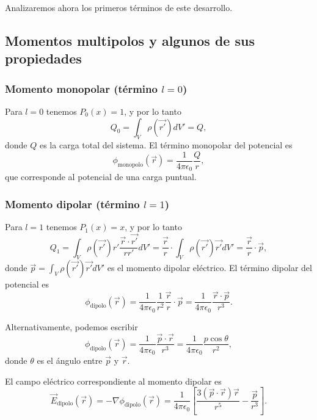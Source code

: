 \documentclass[12pt,a4paper]{book}
\begin{document}
Analizaremos ahora los primeros términos de este desarrollo.

\subsection{Momentos multipolos y algunos de sus propiedades}

\subsubsection{Momento monopolar (término $l=0$)}

Para $l=0$ tenemos $P_0(x) = 1$, y por lo tanto
\begin{equation}
Q_0 = \int_V \rho(\vec{r'}) dV' = Q,
\end{equation}
donde $Q$ es la carga total del sistema. El término monopolar del potencial es
\begin{equation}
\phi_{\text{monopolo}}(\vec{r}) = \frac{1}{4\pi\epsilon_0}\frac{Q}{r},
\end{equation}
que corresponde al potencial de una carga puntual.

\subsubsection{Momento dipolar (término $l=1$)}

Para $l=1$ tenemos $P_1(x) = x$, y por lo tanto
\begin{equation}
Q_1 = \int_V \rho(\vec{r'})r' \frac{\vec{r}\cdot\vec{r'}}{rr'} dV' = \frac{\vec{r}}{r}\cdot\int_V \rho(\vec{r'})\vec{r'} dV' = \frac{\vec{r}}{r}\cdot\vec{p},
\end{equation}
donde $\vec{p} = \int_V \rho(\vec{r'})\vec{r'} dV'$ es el momento dipolar eléctrico. El término dipolar del potencial es
\begin{equation}
\phi_{\text{dipolo}}(\vec{r}) = \frac{1}{4\pi\epsilon_0}\frac{1}{r^2}\frac{\vec{r}}{r}\cdot\vec{p} = \frac{1}{4\pi\epsilon_0}\frac{\vec{r}\cdot\vec{p}}{r^3}.
\end{equation}

Alternativamente, podemos escribir
\begin{equation}
\phi_{\text{dipolo}}(\vec{r}) = \frac{1}{4\pi\epsilon_0}\frac{\vec{p}\cdot\vec{r}}{r^3} = \frac{1}{4\pi\epsilon_0}\frac{p\cos\theta}{r^2},
\end{equation}
donde $\theta$ es el ángulo entre $\vec{p}$ y $\vec{r}$.

El campo eléctrico correspondiente al momento dipolar es
\begin{equation}
\vec{E}_{\text{dipolo}}(\vec{r}) = -\nabla\phi_{\text{dipolo}}(\vec{r}) = \frac{1}{4\pi\epsilon_0}\left[\frac{3(\vec{p}\cdot\vec{r})\vec{r}}{r^5} - \frac{\vec{p}}{r^3}\right].
\end{equation}
\end{document}
